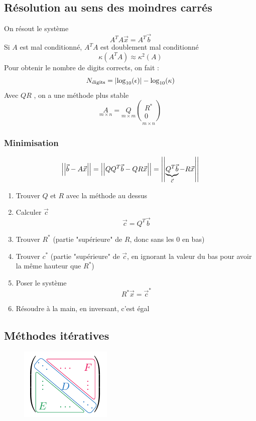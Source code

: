 \documentclass[resume]{subfiles}
\begin{document}
\subsection{Résolution au sens des moindres carrés}
On résout le système
$$A^TA\vec{x}=A^T\vec{b}$$
Si $A$ est mal conditionné, $A^TA$ est doublement mal conditionné
$$\kappa(A^TA)\approx\kappa^2(A)$$
Pour obtenir le nombre de digits corrects, on fait :
$$N_\text{digits}=\abs{\log_{10}(\epsilon)}-\log_{10}(\kappa)$$
Avec $QR$ , on a une méthode plus stable
$$\underset{m\times n}{A}=\underset{m\times m}{Q}\underset{m\times n}{\begin{pmatrix}R^\ast\\ 0\end{pmatrix}}$$
\subsubsection{Minimisation}
$$\abs{\abs{\vec{b}-A\vec{x}}}=\abs{\abs{QQ^T\vec{b}-QR\vec{x}}}=\abs{\abs{\underbrace{Q^T\vec{b}}_{\vec{c}}-R\vec{x}}}$$
\begin{enumerate}
\item Trouver $Q$ et $R$ avec la méthode au dessus
\item Calculer $\vec{c}$
$$\vec{c}=Q^T\vec{b}$$
\item Trouver $R^\ast$ (partie "supérieure" de $R$, donc sans les 0 en bas)
\item Trouver $c^\ast$ (partie "supérieure" de $\vec{c}$, en ignorant la valeur du bas pour avoir la même hauteur que $R^\ast$)
\item Poser le système
$$R^\ast\vec{x}=\vec{c}^\ast$$
\item Résoudre à la main, en inversant, c'est égal
\end{enumerate}
\subsection{Méthodes itératives}
\begin{figure}[H]
\centering
\includegraphics[scale=1,page=1]{drwg_2.pdf}
\end{figure}
\end{document}
